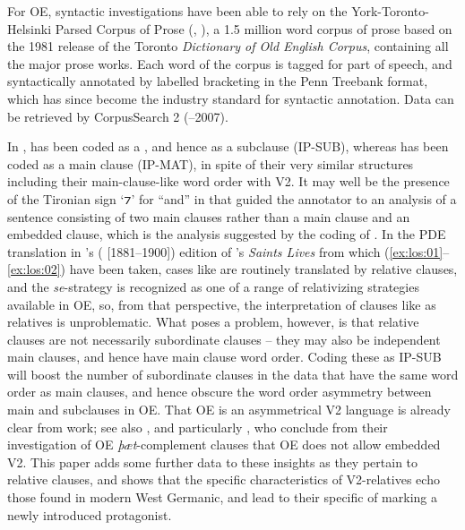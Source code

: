 \documentclass[output=paper,colorlinks,citecolor=brown]{langscibook}
\begin{document}
For OE, syntactic investigations have been able to rely on the York-Toronto-Helsinki Parsed Corpus of  Prose (, \citealt{TaylorTaylor2003}), a 1.5 million word corpus of  prose based on the 1981 release of the Toronto \textit{Dictionary of Old English Corpus}, containing all the major  prose \linebreak[4]works. Each word of the corpus is tagged for part of speech, and syntactically annotated by labelled bracketing in the Penn Treebank format, which has since become the industry standard for syntactic annotation. Data can be retrieved by CorpusSearch 2 (\citealt{Randall2005}–2007).

In ,  has been coded as a , and hence as a subclause (IP-SUB), whereas  has been coded as a main clause (IP-MAT), in spite of their very similar structures including their main-clause-like word order with V2. It may well be the presence of the Tironian sign ‘⁊' for “and” in  that guided the annotator to an analysis of a sentence consisting of two main clauses rather than a main clause and an embedded clause, which is the analysis suggested by the coding of . In the PDE translation in \citeauthor{Skeat1966}'s (\citeyear{Skeat1966} [1881–1900]) edition of 's \textit{Saints Lives} from which (\ref{ex:los:01}--\ref{ex:los:02}) have been taken, cases like  are routinely translated by relative clauses, and the \textit{se}{}-strategy is recognized as one of a range of relativizing strategies available in OE, so, from that perspective, the interpretation of clauses like  as relatives is unproblematic. What poses a problem, however, is that relative clauses are not necessarily subordinate clauses – they may also be independent main clauses, and hence have main clause word order. Coding these as IP-SUB will boost the number of subordinate clauses in the data that have the same word order as main clauses, and hence obscure the word order asymmetry between main and subclauses in OE. That OE is an asymmetrical V2 language is already clear from  work; see also \citet[403--405]{Taylor2014}, and particularly \citet{MeklenborgSalvesen2017}, who conclude from their investigation of OE \textit{þæt}{}-complement clauses that OE does not allow embedded V2. This paper adds some further data to these insights as they pertain to relative clauses, and shows that the specific characteristics of V2-relatives echo those found in modern West Germanic, and lead to their specific  of marking a newly introduced protagonist.
\end{document}
